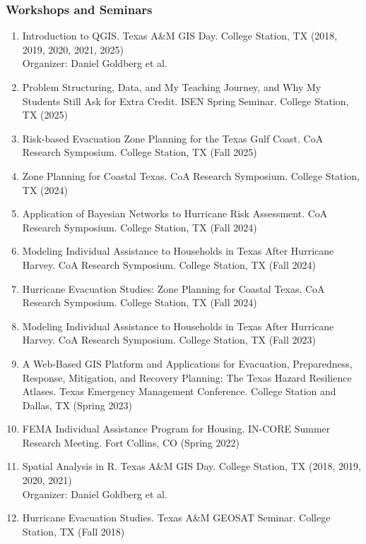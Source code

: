 \documentclass[11pt,oneside]{article}
\begin{document}
\subsubsection{Workshops and Seminars}
\begin{enumerate}[leftmargin=40pt]
\item {Introduction to QGIS. Texas A\&M GIS Day.} College Station, TX (2018, 2019, 2020, 2021, 2025)\\
      Organizer: Daniel Goldberg et al.
\item Problem Structuring, Data, and My Teaching Journey, and Why My Students Still Ask for Extra Credit. ISEN Spring Seminar. College Station, TX (2025)
\item {Risk-based Evacuation Zone Planning for the Texas Gulf Coast.} CoA Research Symposium. College Station, TX (Fall 2025)
\item Zone Planning for Coastal Texas. CoA Research Symposium. College Station, TX (2024) %
\item Application of Bayesian Networks to Hurricane Risk Assessment. CoA Research Symposium. College Station, TX (Fall 2024)
\item Modeling Individual Assistance to Households ​in Texas After Hurricane Harvey. CoA Research Symposium. College Station, TX (Fall 2024)
\item Hurricane Evacuation Studies: Zone Planning for Coastal Texas. CoA Research Symposium. College Station, TX (Fall 2024)
\item Modeling Individual Assistance to Households ​in Texas After Hurricane Harvey. CoA Research Symposium. College Station, TX (Fall 2023)
\item A Web-Based GIS Platform and Applications for Evacuation, Preparedness, Response, Mitigation, and Recovery Planning: The Texas Hazard Resilience Atlases. Texas Emergency Management Conference. College Station and Dallas, TX (Spring 2023)
\item FEMA Individual Assistance Program for Housing. IN-CORE Summer Research Meeting. Fort Collins, CO (Spring 2022)
\item Spatial Analysis in R. Texas A\&M GIS Day. College Station, TX (2018, 2019, 2020, 2021)\\
      Organizer: Daniel Goldberg et al.
\item Hurricane Evacuation Studies. Texas A\&M GEOSAT Seminar. College Station, TX (Fall 2018)

\end{enumerate}
\end{document}
